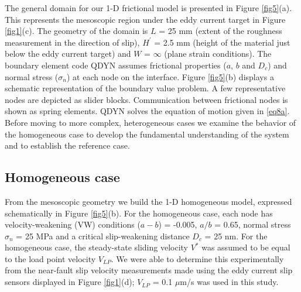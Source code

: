 \documentclass[preprint,1p, 10pt,authoryear]{elsarticle}
\begin{document}
The general domain for our 1-D frictional model is presented in Figure \ref{fig5}(a). This represents the mesoscopic region under the eddy current target in Figure \ref{fig1}(c). The geometry of the domain is $L$ = 25 mm (extent of the roughness measurement in the direction of slip), $H^{'}$ = 2.5 mm (height of the material just below the eddy current target) and $W$ = $\infty$ (plane strain conditions). The boundary element code QDYN assumes frictional properties ($a$, $b$ and $D_{c}$) and normal stress ($\sigma_{n}$) at each node on the interface. Figure \ref{fig5}(b) displays a schematic representation of the boundary value problem. A few representative nodes are depicted as slider blocks. Communication between frictional nodes is shown as spring elements. QDYN  solves the equation of motion given in \eqref{eq8a}. Before moving to more complex, heterogeneous cases we examine the behavior of the homogeneous case to develop the fundamental understanding of the system and to establish the reference case.    

\subsection{Homogeneous case}
From the mesoscopic geometry we build the 1-D homogeneous model, expressed schematically in Figure \ref{fig5}(b). For the homogeneous case, each node has velocity-weakening (VW) conditions ($a-b$) = -0.005, $a/b$ = 0.65, normal stress $\sigma_{n}$ = 25 MPa and a critical slip-weakening distance $D_{c}$ = 25 nm. For the homogeneous case, the steady-state sliding velocity $V^{*}$ was assumed to be equal to the load point velocity $V_{LP}$. We were able to determine this experimentally from the near-fault slip velocity measurements made using the eddy current slip sensors displayed in Figure \ref{fig1}(d); $V_{LP}$ = 0.1 $\mu$m/s  was used in this study.
\end{document}
